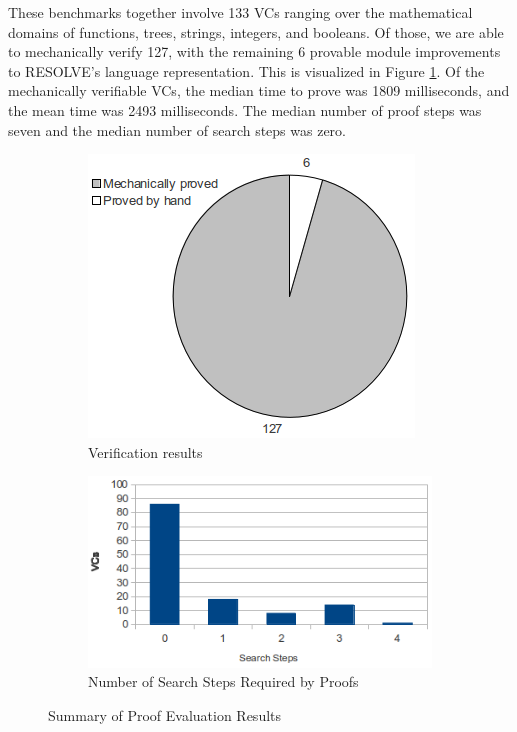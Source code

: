 These benchmarks together involve 133 VCs ranging over the mathematical domains of functions, trees, strings, integers, and booleans.  Of those, we are able to mechanically verify 127, with the remaining 6 provable module improvements to RESOLVE's language representation.  This is visualized in Figure \ref{fig:pie}.  Of the mechanically verifiable VCs, the median time to prove was 1809 milliseconds, and the mean time was 2493 milliseconds.  The median number of proof steps was seven and the median number of search steps was zero.

\begin{figure}
	\centering
	\begin{subfigure}[b]{0.40\textwidth}
		\centering
		\includegraphics[width=\textwidth]{proverEval/proofResults3.png}
		\caption{Verification results\label{fig:pie}}
	\end{subfigure}
	\quad
	\begin{subfigure}[b]{0.55\textwidth}
		\centering
		\includegraphics[width=\textwidth]{proverEval/searchSteps2.png}
		\caption{Number of Search Steps Required by Proofs\label{fig:histogram}}
	\end{subfigure}
	\caption{Summary of Proof Evaluation Results}
\end{figure}

